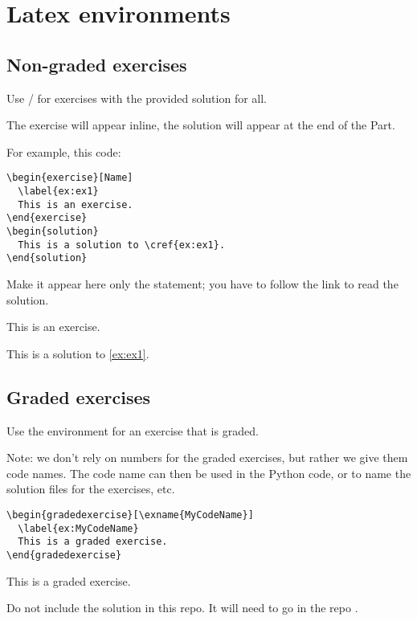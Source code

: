 

\section{Latex environments}

\subsection{Non-graded exercises}

Use / for exercises with the provided solution for all.

The exercise will appear inline, the solution will appear at the end of the Part.

For example, this code:

\begin{verbatim}
\begin{exercise}[Name]
  \label{ex:ex1}
  This is an exercise.
\end{exercise}
\begin{solution}
  This is a solution to \cref{ex:ex1}.
\end{solution}
\end{verbatim}

Make it appear here only the statement; you have to follow the link to read the solution.

\begin{exercise}[Name]
    \label{ex:ex1}
    This is an exercise.
\end{exercise}
\begin{solution}
    This is a solution to \cref{ex:ex1}.
\end{solution}

\subsection{Graded exercises}

Use the environment  for an exercise that is graded.

Note: we don't rely on numbers for the graded exercises, but rather we give them code names.
The code name can then be used in the Python code, or to name the solution files for the exercises, etc.

\begin{verbatim}
\begin{gradedexercise}[\exname{MyCodeName}] 
  \label{ex:MyCodeName}
  This is a graded exercise.
\end{gradedexercise}
\end{verbatim}


\begin{gradedexercise}
    This is a graded exercise.
\end{gradedexercise}


Do not include the solution in this repo.
It will need to go in the repo .

